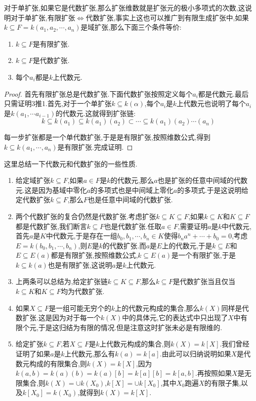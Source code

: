 对于单扩张,如果它是代数扩张,那么扩张维数就是扩张元的极小多项式的次数,这说明对于单扩张,有限扩张$\Leftrightarrow$代数扩张,事实上这也可以推广到有限生成扩张中,如果$k\subseteq F=k(a_1,a_2,\cdots,a_n)$是域扩张,那么下面三个条件等价:
\begin{enumerate}
	\item $k\subseteq F$是有限扩张.
	\item $k\subseteq F$是代数扩张.
	\item 每个$a_i$都是$k$上代数元.
\end{enumerate}
\begin{proof}

首先有限扩张总是代数扩张.下面代数扩张按照定义每个$a_i$都是代数元.最后只需证明3推1.首先,对于一个单扩张$k\subseteq k(\alpha)$,每个$a_i$是$k$上代数元也说明了每个$a_i$是$k(a_1,\cdots a_{i-1})$的代数元.这就得到扩张链:
$$k\subseteq k(a_1)\subseteq k(a_1)(a_2)\subset\cdots\subseteq k(a_1)(a_2)\cdots(a_n)$$

每一步扩张都是一个单代数扩张,于是是有限扩张,按照维数公式,得到$k\subseteq k(a_1,\cdots,a_n)$是有限扩张.完成证明.
\end{proof}

这里总结一下代数元和代数扩张的一些性质.
\begin{enumerate}
	\item 给定域扩张$k\subseteq F$,如果$a\in F$是$k$的代数元,那么$a$也是扩张的任意中间域的代数元.这是因为基域中零化$a$的多项式也是中间域上零化$a$的多项式.于是这说明给定代数扩张$k\subseteq F$,那么$F$也是任意中间域的代数扩张.
	\item 两个代数扩张的复合仍然是代数扩张.考虑扩张$k\subseteq K\subseteq F$,如果$k\subseteq K$和$K\subseteq F$都是代数扩张,我们断言$k\subseteq F$也是代数扩张.任取$a\in F$,需要证明$a$是$k$中代数元,首先$a$是$K$中代数元,于是存在一组$b_0,b_1,\cdots,b_n\in K$使得$b_na^n+\cdots+b_0=0$,考虑$E=k(b_0,b_1,\cdots,b_n)$,则$E$是$k$的代数扩张.而$a$是$E$上的代数元,于是$k\subseteq E$和$E\subseteq E(a)$都是有限扩张,按照维数公式,$k\subseteq E(a)$是一个有限扩张,于是$k\subseteq k(a)$也是有限扩张,这说明$a$是$k$上代数元.
	\item 上两条可以总结为,给定扩张链$k\subseteq K\subseteq F$,那么$k\subseteq F$是代数扩张当且仅当$k\subseteq K$和$K\subseteq F$均为代数扩张.
	\item 如果$X\subseteq F$是一组可能无穷个的$k$上的代数元构成的集合,那么$k(X)$同样是代数扩张.这是因为对于每一个$k(X)$中的具体元,它的表达式中只出现了$X$中有限个元,于是这归结为有限的情况.但是注意这时扩张未必是有限维的.
	\item 给定扩张$k\subseteq F$,若$X\subseteq F$是$k$上代数元构成的集合,则$k(X)=k[X]$.我们曾经证明了如果$a$是$k$上代数元,那么有$k(a)=k[a]$.由此可以归纳说明如果$X$是代数元构成的有限集合,则$k(X)=k[X]$,因为$k(a,b)=k(a)(b)=k(a)[b]=k[a][b]=k[a,b]$.再按照如果$X$是无限集合,则$k(X)=\cup k(X_0)$,$k[X]=\cup k[X_0]$,其中$X_0$跑遍$X$的有限子集,以及$k[X_0]=k(X_0)$,就得到$k(X)=k[X]$.
\end{enumerate}

